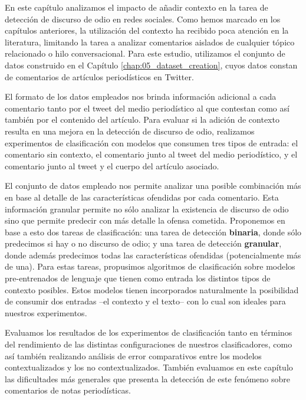 \label{chap:06_contextualized_hate_speech}

En este capítulo analizamos el impacto de añadir contexto en la tarea de detección de discurso de odio en redes sociales. Como hemos marcado en los capítulos anteriores, la utilización del contexto ha recibido poca atención en la literatura, limitando la tarea a analizar comentarios aislados de cualquier tópico relacionado o hilo conversacional. Para este estudio, utilizamos el conjunto de datos construido en el Capítulo \ref{chap:05_dataset_creation}, cuyos datos constan de comentarios de artículos periodísticos en Twitter.

El formato de los datos empleados nos brinda información adicional a cada comentario tanto por el tweet del medio periodístico al que contestan como así también por el contenido del artículo. Para evaluar si la adición de contexto resulta en una mejora en la detección de discurso de odio, realizamos experimentos de clasificación con modelos que consumen tres tipos de entrada: el comentario sin contexto, el comentario junto al tweet del medio periodístico, y el comentario junto al tweet y el cuerpo del artículo asociado.


El conjunto de datos empleado nos permite analizar una posible combinación más en base al detalle de las características ofendidas por cada comentario. Esta información granular permite no sólo analizar la existencia de discurso de odio sino que permite predecir con más detalle la ofensa cometida. Proponemos en base a esto dos tareas de clasificación: una tarea de detección \textbf{binaria}, donde sólo predecimos si hay o no discurso de odio; y una tarea de detección \textbf{granular}, donde además predecimos todas las características ofendidas (potencialmente más de una). Para estas tareas, propusimos algoritmos de clasificación sobre modelos pre-entrenados de lenguaje que tienen como entrada los distintos tipos de contexto posibles. Estos modelos tienen incorporados naturalmente la posibilidad de consumir dos entradas --el contexto y el texto-- con lo cual son ideales para nuestros experimentos.

Evaluamos los resultados de los experimentos de clasificación tanto en términos del rendimiento de las distintas configuraciones de nuestros clasificadores, como así también realizando análisis de error comparativos entre los modelos contextualizados y los no contextualizados. También evaluamos en este capítulo las dificultades más generales que presenta la detección de este fenómeno sobre comentarios de notas periodísticas.

